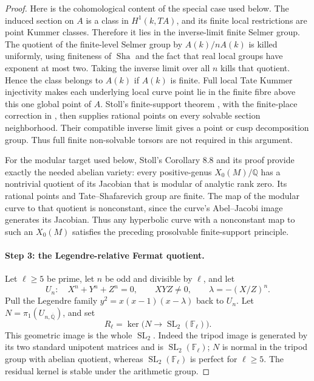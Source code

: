 \begin{proof}
Here is the cohomological content of the special case used below.
The induced section on $A$ is a class in
$H^1(k,T A)$, and its finite local restrictions are point Kummer
classes.  Therefore it lies in the inverse-limit finite Selmer
group.  The quotient of the finite-level Selmer group by
$A(k)/nA(k)$ is killed uniformly, using finiteness of $\operatorname{Sha}$ and
the fact that real local groups have exponent at most two.
Taking the inverse limit over all $n$ kills that quotient.  Hence
the class belongs to $A(k)$ if $A(k)$ is finite.  Full local Tate
Kummer injectivity makes each underlying local curve point lie in
the finite fibre above this one global point of $A$.  Stoll's
finite-support theorem \cite[Theorem 8.2]{DE_Stoll2007}, with the
finite-place correction in \cite{DE_StollErratum}, then supplies rational points on every
solvable section neighborhood.  Their compatible inverse limit
gives a point or cusp decomposition group.  Thus full finite
non-solvable torsors are not required in this argument.

For the modular target used below, Stoll's Corollary 8.8 and its
proof \cite{DE_Stoll2007} provide exactly the needed abelian variety: every
positive-genus $X_0(M)/\mathbb Q$ has a nontrivial quotient of its
Jacobian that is modular of analytic rank zero.  Its rational
points and Tate--Shafarevich group are finite.  The map of the
modular curve to that quotient is nonconstant, since the curve's
Abel--Jacobi image generates its Jacobian.  Thus any hyperbolic
curve with a nonconstant map to such an $X_0(M)$ satisfies the
preceding prosolvable finite-support principle.

\paragraph{Step 3: the Legendre-relative Fermat quotient.}

Let $\ell\ge5$ be prime, let $n$ be odd and divisible by $\ell$,
and let
\[
 U_n:\quad X^n+Y^n+Z^n=0,\qquad XYZ\ne0,
 \qquad\lambda=-(X/Z)^n.
\]
Pull the Legendre family $y^2=x(x-1)(x-\lambda)$ back to $U_n$.
Let $N=\pi_1(U_{n,\overline{\mathbb Q}})$, and set
\[
 R_\ell=\ker\bigl(N\longrightarrow
                         \operatorname{SL}_2(\mathbb F_\ell)\bigr).
\]
This geometric image is the whole $\operatorname{SL}_2$.
Indeed the tripod image is generated by its two standard
unipotent matrices and is $\operatorname{SL}_2(\mathbb F_\ell)$;
$N$ is normal in the tripod group with abelian quotient, whereas
$\operatorname{SL}_2(\mathbb F_\ell)$ is perfect for $\ell\ge5$.
The residual kernel is stable under the arithmetic group.


\end{proof}
